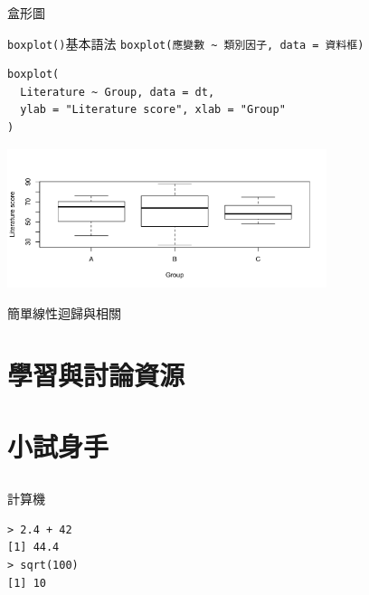 \documentclass[12pt]{beamer}
\begin{document}
\begin{frame}[fragile]{盒形圖}

\begin{block}{\texttt{boxplot()}基本語法}
\verb+boxplot(應變數 ~ 類別因子, data = 資料框)+
\end{block}

\begin{verbatim}
boxplot(
  Literature ~ Group, data = dt, 
  ylab = "Literature score", xlab = "Group"
)
\end{verbatim}

\begin{center}
\includegraphics[width=0.7\textwidth]{Rplot-three-group.pdf}
\end{center}
\end{frame}

\begin{frame}[fragile]{簡單線性迴歸與相關}
\end{frame}





\section{學習與討論資源}\subsection{}

\section{小試身手}\subsection{}

\begin{frame}[fragile]{計算機}
\begin{verbatim}
> 2.4 + 42
[1] 44.4
> sqrt(100)
[1] 10
\end{verbatim}
\end{frame}
\end{document}
